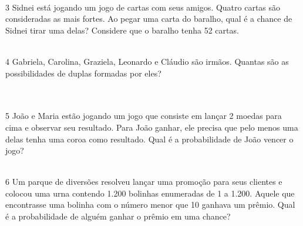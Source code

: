 {{{{\\
\\
\\
\\
\\
\\

\num{3} Sidnei está jogando um jogo de cartas com seus amigos. Quatro cartas são
consideradas as mais fortes. Ao pegar uma carta do baralho, qual é a
chance de Sidnei tirar uma delas? Considere que o baralho tenha 52
cartas.

\\

\num{4} Gabriela, Carolina, Graziela, Leonardo e Cláudio são irmãos. Quantas são
as possibilidades de duplas formadas por eles?

\\
\\

\num{5} João e Maria estão jogando um jogo que consiste em lançar 2 moedas
para cima e observar seu resultado. Para João ganhar, ele precisa que
pelo menos uma delas tenha uma coroa como resultado. Qual é a
probabilidade de João vencer o jogo?

\\

\num{6} Um parque de diversões resolveu lançar uma promoção para seus
clientes e colocou uma urna contendo 1.200 bolinhas enumeradas de 1 a
1.200. Aquele que encontrasse uma bolinha com o número menor que 10
ganhava um prêmio. Qual é a probabilidade de alguém ganhar o prêmio em
uma chance?

\\

}}}}
